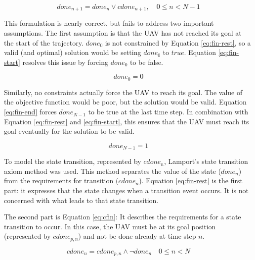 \begin{equation}
\label{eq:fin-rest}
done_{n+1} = done_n \vee cdone_{n+1},  \quad 0 \leq n < N  - 1
\end{equation}

This formulation is nearly correct, but fails to address two important assumptions. The first assumption is that the UAV has not reached its goal at the start of the trajectory. $done_0$ is not constrained by Equation \ref{eq:fin-rest}, so a valid (and optimal) solution would be setting $done_0$ to $true$. Equation \ref{eq:fin-start} resolves this issue by forcing $done_0$ to be false.

\begin{equation}
\label{eq:fin-start}
done_0 = 0
\end{equation}

Similarly, no constraints actually force the UAV to reach its goal. The value of the objective function would be poor, but the solution would be valid. Equation \ref{eq:fin-end} forces $done_{N-1}$ to be true at the last time step. In combination with Equation \ref{eq:fin-rest} and \ref{eq:fin-start}, this ensures that the UAV must reach its goal eventually for the solution to be valid.

\begin{equation}
\label{eq:fin-end}
done_{N - 1} = 1
\end{equation}

To model the state transition, represented by $cdone_{n}$, Lamport's \cite{Lamport1989} state transition axiom method was used. This method separates the value of the state ($done_{n}$) from the requirements for transition ($cdone_{n}$). Equation \ref{eq:fin-rest} is the first part: it expresses that the state changes when a transition event occurs. It is not concerned with what leads to that state transition. 
\par
The second part is Equation \ref{eq:cfin}: It describes the requirements for a state transition to occur. In this case, the UAV must be at its goal position (represented by $cdone_{p,n}$) and not be done already at time step $n$.

\begin{equation}
\label{eq:cfin}
cdone_n =  cdone_{p,n} \wedge \neg done_n\quad 0 \leq n < N
\end{equation}

